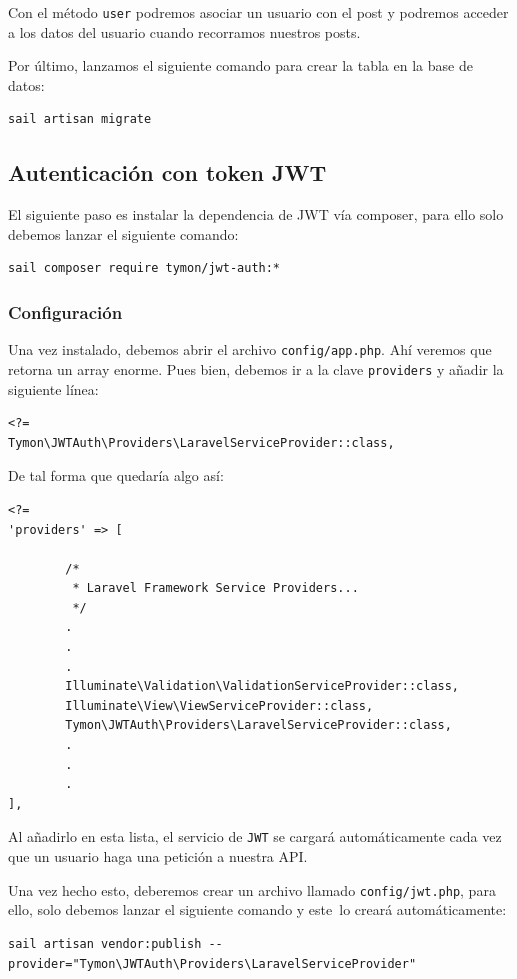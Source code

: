 \documentclass[11pt]{article}
\begin{document}
Con el método \texttt{user} podremos asociar un usuario con el post y podremos
acceder a los datos del usuario cuando recorramos nuestros posts.

Por último, lanzamos el siguiente comando para crear la tabla en la
base de datos:
\begin{verbatim}
sail artisan migrate
\end{verbatim}

\subsection{Autenticación con token JWT}
\label{sec:orgb1bc889}
El siguiente paso es instalar la dependencia de JWT vía composer, para
ello solo debemos lanzar el siguiente comando:
\begin{verbatim}
sail composer require tymon/jwt-auth:*
\end{verbatim}

\subsubsection{Configuración}
\label{sec:orgb228d47}
Una vez instalado, debemos abrir el archivo \texttt{config/app.php}. Ahí
veremos que retorna un array enorme. Pues bien, debemos ir a la clave
\texttt{providers} y añadir la siguiente línea:
\begin{verbatim}
<?=
Tymon\JWTAuth\Providers\LaravelServiceProvider::class,
\end{verbatim}

De tal forma que quedaría algo así:
\begin{verbatim}
<?=
'providers' => [

        /*
         * Laravel Framework Service Providers...
         */
        .
        .
        .
        Illuminate\Validation\ValidationServiceProvider::class,
        Illuminate\View\ViewServiceProvider::class,
        Tymon\JWTAuth\Providers\LaravelServiceProvider::class,
        .
        .
        .
],
\end{verbatim}

Al añadirlo en esta lista, el servicio de \texttt{JWT} se cargará
automáticamente cada vez que un usuario haga una petición a nuestra
API.

Una vez hecho esto, deberemos crear un archivo llamado \texttt{config/jwt.php},
para ello, solo debemos lanzar el siguiente comando y este lo creará
automáticamente:
\begin{verbatim}
sail artisan vendor:publish --provider="Tymon\JWTAuth\Providers\LaravelServiceProvider"
\end{verbatim}
\end{document}
